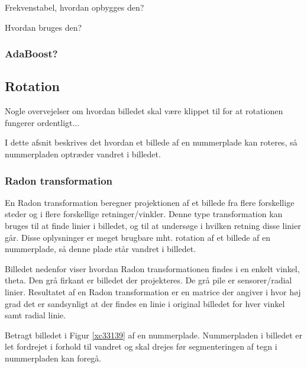 Frekvenstabel, hvordan opbygges den?

Hvordan bruges den?

\subsubsection{AdaBoost?}



\subsection{Rotation}

Nogle overvejelser om hvordan billedet skal være klippet til for at rotationen fungerer ordentligt...

I dette afsnit beskrives det hvordan et billede af en nummerplade kan roteres, så nummerpladen optræder vandret i billedet.



\subsubsection{Radon transformation}

En Radon transformation beregner projektionen af et billede fra flere forskellige steder og i flere forskellige retninger/vinkler. Denne type transformation kan bruges til at finde linier i billedet, og til at undersøge i hvilken retning disse linier går. Disse oplysninger er meget brugbare mht. rotation af et billede af en nummerplade, så denne plade står vandret i billedet.

Billedet nedenfor viser hvordan Radon transformationen findes i en enkelt vinkel, theta. Den grå firkant er billedet der projekteres. De grå pile er sensorer/radial linier. Resultatet af en Radon transformation er en matrice der angiver i hvor høj grad det er sandsynligt at der findes en linie i original billedet for hver vinkel samt radial linie.


Betragt billedet i Figur \ref{xc33139} af en nummerplade. Nummerpladen i billedet er let fordrejet i forhold til vandret og skal drejes før segmenteringen af tegn i nummerpladen kan foregå.

